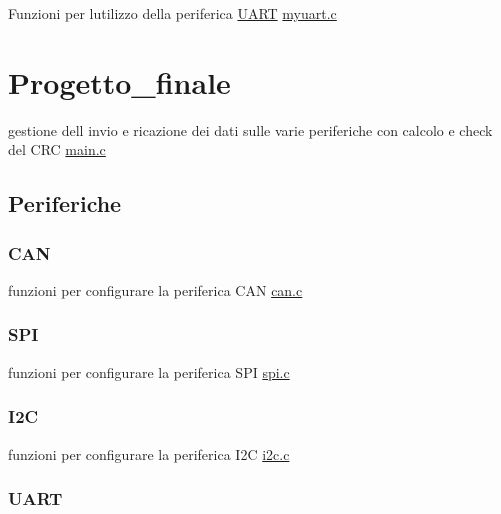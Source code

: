 \begin{DoxyItemize}
\item Funzioni per l\textquotesingle{}utilizzo della periferica \hyperlink{structUART}{U\+A\+RT}  \hyperlink{myuart_8c}{myuart.\+c} 
\end{DoxyItemize}\hypertarget{index_Progetto_finale}{}\section{Progetto\+\_\+finale}\label{index_Progetto_finale}

\begin{DoxyItemize}
\item gestione dell\textquotesingle{} invio e ricazione dei dati sulle varie periferiche con calcolo e check del C\+RC \hyperlink{STM_2CRC__MultiSerial_2Src_2main_8c}{main.\+c} 
\end{DoxyItemize}\hypertarget{index_Periferiche}{}\subsection{Periferiche}\label{index_Periferiche}
\hypertarget{index_CAN}{}\subsubsection{C\+AN}\label{index_CAN}

\begin{DoxyItemize}
\item funzioni per configurare la periferica C\+AN \hyperlink{can_8c}{can.\+c} 
\end{DoxyItemize}\hypertarget{index_SPI}{}\subsubsection{S\+PI}\label{index_SPI}

\begin{DoxyItemize}
\item funzioni per configurare la periferica S\+PI \hyperlink{spi_8c}{spi.\+c} 
\end{DoxyItemize}\hypertarget{index_I2C}{}\subsubsection{I2C}\label{index_I2C}

\begin{DoxyItemize}
\item funzioni per configurare la periferica I2C \hyperlink{i2c_8c}{i2c.\+c} 
\end{DoxyItemize}\hypertarget{index_UART}{}\subsubsection{U\+A\+RT}\label{index_UART}

